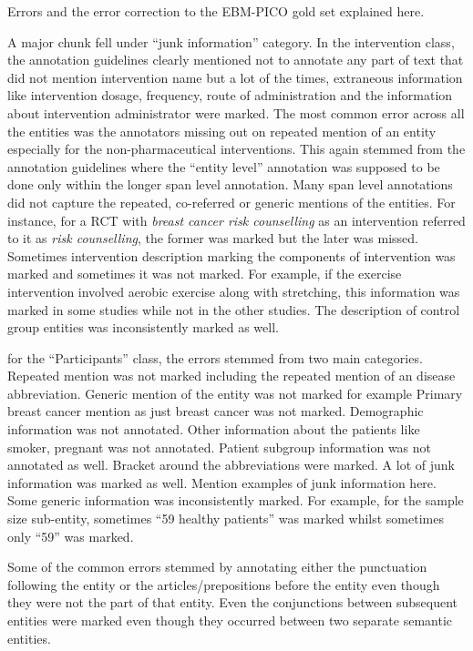 \documentclass[10.7pt,]{article}
\begin{document}
Errors and the error correction to the EBM-PICO gold set explained here. 

A major chunk fell under ``junk information'' category.
In the intervention class, the annotation guidelines clearly mentioned not to annotate any part of text that did not mention intervention name but a lot of the times, extraneous information like intervention dosage, frequency, route of administration and the information about intervention administrator were marked. 
The most common error across all the entities was the annotators missing out on repeated mention of an entity especially for the non-pharmaceutical interventions. 
This again stemmed from the annotation guidelines where the ``entity level'' annotation was supposed to be done only within the longer span level annotation.
Many span level annotations did not capture the repeated, co-referred or generic mentions of the entities.
For instance, for a RCT with \textit{breast cancer risk counselling} as an intervention referred to it as \textit{risk counselling}, the former was marked but the later was missed.
Sometimes intervention description marking the components of intervention was marked and sometimes it was not marked.
For example, if the exercise intervention involved aerobic exercise along with stretching, this information was marked in some studies while not in the other studies.
The description of control group entities was inconsistently marked as well.

for the ``Participants'' class, the errors stemmed from two main categories.
Repeated mention was not marked including the repeated mention of an disease abbreviation.
Generic mention of the entity was not marked for example Primary breast cancer mention as just breast cancer was not marked. 
Demographic information was not annotated.
Other information about the patients like smoker, pregnant was not annotated.
Patient subgroup information was not annotated as well.
Bracket around the abbreviations were marked.
A lot of junk information was marked as well. Mention examples of junk information here.
Some generic information was inconsistently marked. For example, for the sample size sub-entity, sometimes ``59 healthy patients'' was marked whilst sometimes only ``59'' was marked.




Some of the common errors stemmed by annotating either the punctuation following the entity or the articles/prepositions before the entity even though they were not the part of that entity.
Even the conjunctions between subsequent entities were marked even though they occurred between two separate semantic entities.
\end{document}

